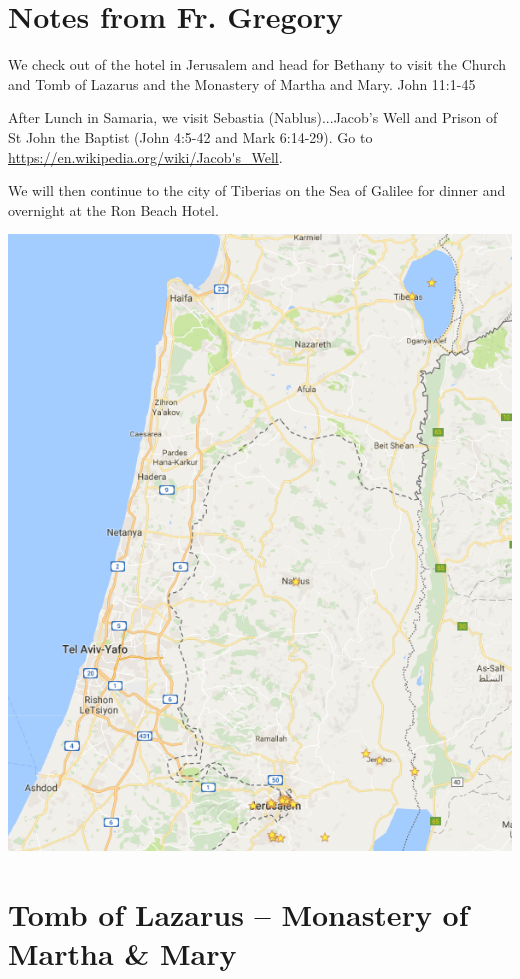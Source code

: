 \documentclass[letterpaper]{report}
\begin{document}
\section{Notes from Fr. Gregory}
We check out of the hotel in Jerusalem and head for Bethany to visit the 
Church and Tomb of Lazarus and the Monastery of Martha and Mary.
John 11:1-45

After Lunch in Samaria, we visit Sebastia (Nablus)...Jacob's
Well and Prison of St John the Baptist (John 4:5-42 and Mark 6:14-29). Go to
\url{https://en.wikipedia.org/wiki/Jacob's_Well}.

We will then continue to the city of Tiberias on the Sea of Galilee for dinner 
and overnight at the Ron Beach Hotel.

\includegraphics[height=\textheight]{JerusalemSeaOfGalile}


\clearpage
\section{Tomb of Lazarus -- Monastery of Martha \& Mary}
\begin{multicols}{2}
	\mbox{}
\end{multicols}
\end{document}
